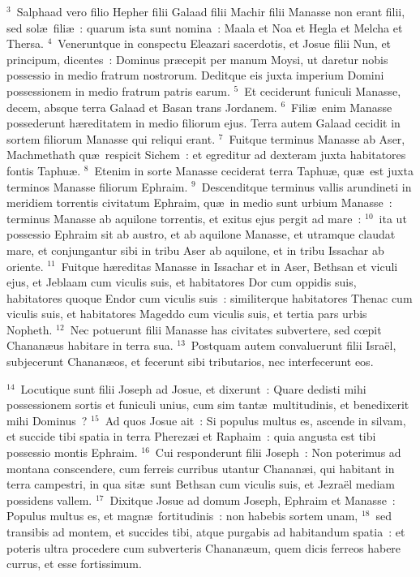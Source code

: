 ${}^{3}$~Salphaad vero filio Hepher filii Galaad filii Machir filii Manasse non erant filii, sed sol\ae\ fili\ae~: quarum ista sunt nomina~: Maala et Noa et Hegla et Melcha et Thersa.
${}^{4}$~Veneruntque in conspectu Eleazari sacerdotis, et Josue filii Nun, et principum, dicentes~: Dominus pr\ae cepit per manum Moysi, ut daretur nobis possessio in medio fratrum nostrorum. Deditque eis juxta imperium Domini possessionem in medio fratrum patris earum.
${}^{5}$~Et ceciderunt funiculi Manasse, decem, absque terra Galaad et Basan trans Jordanem.
${}^{6}$~Fili\ae\ enim Manasse possederunt h\ae reditatem in medio filiorum ejus. Terra autem Galaad cecidit in sortem filiorum Manasse qui reliqui erant.
${}^{7}$~Fuitque terminus Manasse ab Aser, Machmethath qu\ae\ respicit Sichem~: et egreditur ad dexteram juxta habitatores fontis Taphu\ae .
${}^{8}$~Etenim in sorte Manasse ceciderat terra Taphu\ae , qu\ae\ est juxta terminos Manasse filiorum Ephraim.
${}^{9}$~Descenditque terminus vallis arundineti in meridiem torrentis civitatum Ephraim, qu\ae\ in medio sunt urbium Manasse~: terminus Manasse ab aquilone torrentis, et exitus ejus pergit ad mare~:
${}^{10}$~ita ut possessio Ephraim sit ab austro, et ab aquilone Manasse, et utramque claudat mare, et conjungantur sibi in tribu Aser ab aquilone, et in tribu Issachar ab oriente.
${}^{11}$~Fuitque h\ae reditas Manasse in Issachar et in Aser, Bethsan et viculi ejus, et Jeblaam cum viculis suis, et habitatores Dor cum oppidis suis, habitatores quoque Endor cum viculis suis~: similiterque habitatores Thenac cum viculis suis, et habitatores Mageddo cum viculis suis, et tertia pars urbis Nopheth.
${}^{12}$~Nec potuerunt filii Manasse has civitates subvertere, sed cœpit Chanan\ae us habitare in terra sua.
${}^{13}$~Postquam autem convaluerunt filii Isra\"el, subjecerunt Chanan\ae os, et fecerunt sibi tributarios, nec interfecerunt eos.


${}^{14}$~Locutique sunt filii Joseph ad Josue, et dixerunt~: Quare dedisti mihi possessionem sortis et funiculi unius, cum sim tant\ae\ multitudinis, et benedixerit mihi Dominus~?
${}^{15}$~Ad quos Josue ait~: Si populus multus es, ascende in silvam, et succide tibi spatia in terra Pherez\ae i et Raphaim~: quia angusta est tibi possessio montis Ephraim.
${}^{16}$~Cui responderunt filii Joseph~: Non poterimus ad montana conscendere, cum ferreis curribus utantur Chanan\ae i, qui habitant in terra campestri, in qua sit\ae\ sunt Bethsan cum viculis suis, et Jezra\"el mediam possidens vallem.
${}^{17}$~Dixitque Josue ad domum Joseph, Ephraim et Manasse~: Populus multus es, et magn\ae\ fortitudinis~: non habebis sortem unam,
${}^{18}$~sed transibis ad montem, et succides tibi, atque purgabis ad habitandum spatia~: et poteris ultra procedere cum subverteris Chanan\ae um, quem dicis ferreos habere currus, et esse fortissimum.

